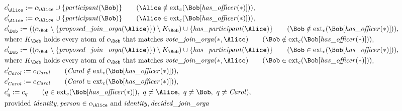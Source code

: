 \begin{align*}
&
c'_
{
\Alice
}
 := 
c_
{
\Alice
}
 \cup 
\{
\mathit{\detokenize{
participant
}}
(
\Bob
)
\}
 \qquad (
\Alice
 \notin 
\mathrm{ext}_c(
\Bob
[
\mathit{\detokenize{
has_officer
}}
(
\ast
)
]
)
)
,\\
&
c'_
{
\Alice
}
 := 
c_
{
\Alice
}
 \cup 
\{
\mathit{\detokenize{
participant
}}
(
\Bob
)
\}
 \qquad (
\Alice
 \in 
\mathrm{ext}_c(
\Bob
[
\mathit{\detokenize{
has_officer
}}
(
\ast
)
]
)
)
,\\
&
c'_
{
\Bob
}
 := 
(
(c_
{
\Bob
}
 \setminus 
\{
\mathit{\detokenize{
proposed_join_orga
}}
(
\Alice
)
\}
) \setminus K_
{
\Bob
}
) \cup 
\{
\mathit{\detokenize{
has_participant
}}
(
\Alice
)
\}
 \qquad (
\Bob
 \notin 
\mathrm{ext}_c(
\Bob
[
\mathit{\detokenize{
has_officer
}}
(
\ast
)
]
)
)
,\\
&
\text{where } K_
{
\Bob
}
 \text{ holds every atom of } c_
{
\Bob
}
 \text{ that matches } 
\mathit{\detokenize{
vote_join_orga
}}
(
\ast
,
\Alice
)
 \qquad (
\Bob
 \notin 
\mathrm{ext}_c(
\Bob
[
\mathit{\detokenize{
has_officer
}}
(
\ast
)
]
)
)
,\\
&
c'_
{
\Bob
}
 := 
(
(c_
{
\Bob
}
 \setminus 
\{
\mathit{\detokenize{
proposed_join_orga
}}
(
\Alice
)
\}
) \setminus K_
{
\Bob
}
) \cup 
\{
\mathit{\detokenize{
has_participant
}}
(
\Alice
)
\}
 \qquad (
\Bob
 \in 
\mathrm{ext}_c(
\Bob
[
\mathit{\detokenize{
has_officer
}}
(
\ast
)
]
)
)
,\\
&
\text{where } K_
{
\Bob
}
 \text{ holds every atom of } c_
{
\Bob
}
 \text{ that matches } 
\mathit{\detokenize{
vote_join_orga
}}
(
\ast
,
\Alice
)
 \qquad (
\Bob
 \in 
\mathrm{ext}_c(
\Bob
[
\mathit{\detokenize{
has_officer
}}
(
\ast
)
]
)
)
,\\
&
c'_
{
\mathit{Carol}
}
 := 
c_
{
\mathit{Carol}
}
 \qquad (
\mathit{Carol}
 \notin 
\mathrm{ext}_c(
\Bob
[
\mathit{\detokenize{
has_officer
}}
(
\ast
)
]
)
)
,\\
&
c'_
{
\mathit{Carol}
}
 := 
c_
{
\mathit{Carol}
}
 \qquad (
\mathit{Carol}
 \in 
\mathrm{ext}_c(
\Bob
[
\mathit{\detokenize{
has_officer
}}
(
\ast
)
]
)
)
,\\
&
c'_
q
 := 
c_
q
 \qquad (
q
 \in 
\mathrm{ext}_c(
\Bob
[
\mathit{\detokenize{
has_officer
}}
(
\ast
)
]
)
,\ 
q \neq 
\Alice
,\ 
q \neq 
\Bob
,\ 
q \neq 
\mathit{Carol}
)
,\\
&
\text{provided } 
\mathit{\detokenize{
identity
}}
,
\mathit{\detokenize{
person
}}
 \in c_
{
\Alice
}
 \text{ and } 
\mathit{\detokenize{
identity
}}
,
\mathit{\detokenize{
decided_join_orga
}}
\end{align*}
